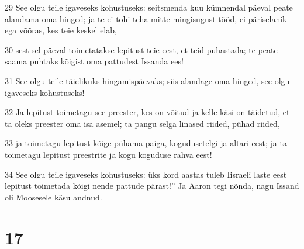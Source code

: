 \par 29 See olgu teile igaveseks kohustuseks: seitsmenda kuu kümnendal päeval peate alandama oma hinged; ja te ei tohi teha mitte mingisugust tööd, ei päriselanik ega võõras, kes teie keskel elab,
\par 30 sest sel päeval toimetatakse lepitust teie eest, et teid puhastada; te peate saama puhtaks kõigist oma pattudest Issanda ees!
\par 31 See olgu teile täielikuks hingamispäevaks; siis alandage oma hinged, see olgu igaveseks kohustuseks!
\par 32 Ja lepitust toimetagu see preester, kes on võitud ja kelle käsi on täidetud, et ta oleks preester oma isa asemel; ta pangu selga linased riided, pühad riided,
\par 33 ja toimetagu lepitust kõige pühama paiga, kogudusetelgi ja altari eest; ja ta toimetagu lepitust preestrite ja kogu koguduse rahva eest!
\par 34 See olgu teile igaveseks kohustuseks: üks kord aastas tuleb Iisraeli laste eest lepitust toimetada kõigi nende pattude pärast!” Ja Aaron tegi nõnda, nagu Issand oli Moosesele käsu andnud.

\chapter{17}

